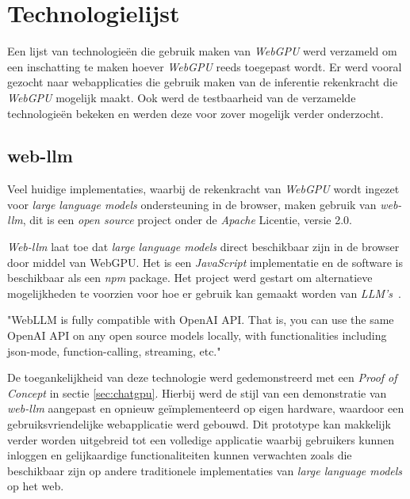 \chapter{Technologielijst}
\label{ch:technologylist}

Een lijst van technologieën die gebruik maken van \textit{WebGPU} werd verzameld om een inschatting te maken hoever \textit{WebGPU} reeds toegepast wordt. Er werd vooral gezocht naar webapplicaties die gebruik maken van de inferentie rekenkracht die \textit{WebGPU} mogelijk maakt. Ook werd de testbaarheid van de verzamelde technologieën bekeken en werden deze voor zover mogelijk verder onderzocht.

\section{web-llm}

Veel huidige implementaties, waarbij de rekenkracht van \textit{WebGPU} wordt ingezet voor \textit{large language models} ondersteuning in de browser, maken gebruik van \textit{web-llm}, dit is een \textit{open source} project onder de \textit{Apache} Licentie, versie 2.0.

\bigbreak{}

\textit{Web-llm} laat toe dat \textit{large language models} direct beschikbaar zijn in de browser door middel van WebGPU. Het is een \textit{JavaScript} implementatie en de software is beschikbaar als een \textit{npm} package. Het project werd gestart om alternatieve mogelijkheden te voorzien voor hoe er gebruik kan gemaakt worden van \textit{LLM's}~\autocite{mlcai2024}.

\begin{displayquote}
    "WebLLM is fully compatible with OpenAI API. That is, you can use the same OpenAI API on any open source models locally, with functionalities including json-mode, function-calling, streaming, etc."
\end{displayquote}

De toegankelijkheid van deze technologie werd gedemonstreerd met een \textit{Proof of Concept} in sectie \ref{sec:chatgpu}. Hierbij werd de stijl van een demonstratie van \textit{web-llm} aangepast en opnieuw geïmplementeerd op eigen hardware, waardoor een ge\-bruiks\-vrien\-de\-lij\-ke webapplicatie werd gebouwd. Dit prototype kan makkelijk verder worden uitgebreid tot een volledige applicatie waarbij gebruikers kunnen inloggen en gelijkaardige functionaliteiten kunnen verwachten zoals die beschikbaar zijn op andere traditionele implementaties van \textit{large language models} op het web.

